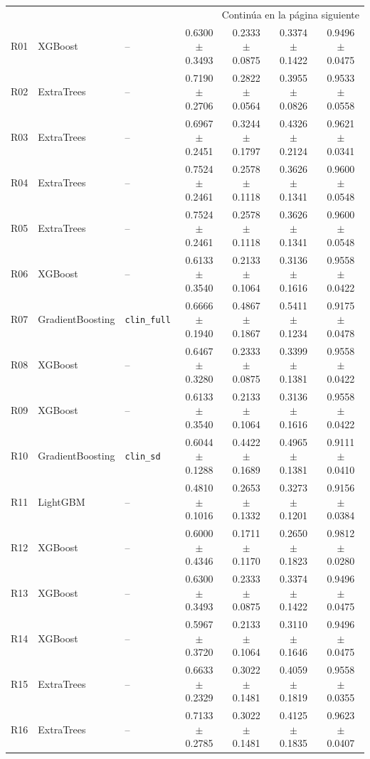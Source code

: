 \begin{landscape}
\begin{longtable}{rllcccc}
\midrule
\multicolumn{7}{r}{Continúa en la página siguiente} \\
\endfoot
\bottomrule
\endlastfoot
R01 & XGBoost & -- & 0.6300 $\pm$ 0.3493 & 0.2333 $\pm$ 0.0875 & 0.3374 $\pm$ 0.1422 & 0.9496 $\pm$ 0.0475 \\
R02 & ExtraTrees & -- & 0.7190 $\pm$ 0.2706 & 0.2822 $\pm$ 0.0564 & 0.3955 $\pm$ 0.0826 & 0.9533 $\pm$ 0.0558 \\
R03 & ExtraTrees & -- & 0.6967 $\pm$ 0.2451 & 0.3244 $\pm$ 0.1797 & 0.4326 $\pm$ 0.2124 & 0.9621 $\pm$ 0.0341 \\
R04 & ExtraTrees & -- & 0.7524 $\pm$ 0.2461 & 0.2578 $\pm$ 0.1118 & 0.3626 $\pm$ 0.1341 & 0.9600 $\pm$ 0.0548 \\
R05 & ExtraTrees & -- & 0.7524 $\pm$ 0.2461 & 0.2578 $\pm$ 0.1118 & 0.3626 $\pm$ 0.1341 & 0.9600 $\pm$ 0.0548 \\
R06 & XGBoost & -- & 0.6133 $\pm$ 0.3540 & 0.2133 $\pm$ 0.1064 & 0.3136 $\pm$ 0.1616 & 0.9558 $\pm$ 0.0422 \\
R07 & GradientBoosting & \texttt{clin\_full} & 0.6666 $\pm$ 0.1940 & 0.4867 $\pm$ 0.1867 & 0.5411 $\pm$ 0.1234 & 0.9175 $\pm$ 0.0478 \\
R08 & XGBoost & -- & 0.6467 $\pm$ 0.3280 & 0.2333 $\pm$ 0.0875 & 0.3399 $\pm$ 0.1381 & 0.9558 $\pm$ 0.0422 \\
R09 & XGBoost & -- & 0.6133 $\pm$ 0.3540 & 0.2133 $\pm$ 0.1064 & 0.3136 $\pm$ 0.1616 & 0.9558 $\pm$ 0.0422 \\
R10 & GradientBoosting & \texttt{clin\_sd} & 0.6044 $\pm$ 0.1288 & 0.4422 $\pm$ 0.1689 & 0.4965 $\pm$ 0.1381 & 0.9111 $\pm$ 0.0410 \\
R11 & LightGBM & -- & 0.4810 $\pm$ 0.1016 & 0.2653 $\pm$ 0.1332 & 0.3273 $\pm$ 0.1201 & 0.9156 $\pm$ 0.0384 \\
R12 & XGBoost & -- & 0.6000 $\pm$ 0.4346 & 0.1711 $\pm$ 0.1170 & 0.2650 $\pm$ 0.1823 & 0.9812 $\pm$ 0.0280 \\
R13 & XGBoost & -- & 0.6300 $\pm$ 0.3493 & 0.2333 $\pm$ 0.0875 & 0.3374 $\pm$ 0.1422 & 0.9496 $\pm$ 0.0475 \\
R14 & XGBoost & -- & 0.5967 $\pm$ 0.3720 & 0.2133 $\pm$ 0.1064 & 0.3110 $\pm$ 0.1646 & 0.9496 $\pm$ 0.0475 \\
R15 & ExtraTrees & -- & 0.6633 $\pm$ 0.2329 & 0.3022 $\pm$ 0.1481 & 0.4059 $\pm$ 0.1819 & 0.9558 $\pm$ 0.0355 \\
R16 & ExtraTrees & -- & 0.7133 $\pm$ 0.2785 & 0.3022 $\pm$ 0.1481 & 0.4125 $\pm$ 0.1835 & 0.9623 $\pm$ 0.0407 \\

\end{longtable}
\end{landscape}
